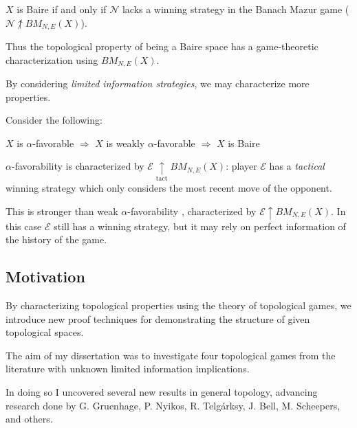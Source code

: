 \documentclass{beamer}
\theoremstyle{definition}
\newcommand{\win}{\uparrow}
\newcommand{\tactwin}{\underset{\text{tact}}{\uparrow}}
\newcommand{\<}{\langle}
\renewcommand{\>}{\rangle}
\newcommand{\pl}[1]{\mathscr{#1}}
\newcommand{\term}{\textit}
\newcommand{\bmGame}[1]{{BM}_{N,E}(#1)}
\begin{document}
\begin{frame}
  \begin{theorem}
    $X$ is Baire if and only if $\pl N$ lacks a winning strategy
    in the Banach Mazur game ($\pl N\not\win\bmGame{X}$).
  \end{theorem}

  \pause

  Thus the topological property of being a Baire space has a game-theoretic
  characterization using $\bmGame{X}$.

  \vpause

  By considering \term{limited information strategies}, we may characterize
  more properties.
\end{frame}

\begin{frame}
  Consider the following:

  \begin{theorem}
    $X$ is $\alpha$-favorable $\Rightarrow$
    $X$ is weakly $\alpha$-favorable $\Rightarrow$
    $X$ is Baire
  \end{theorem}

  \pause

  $\alpha$-favorability is characterized by $\pl E\tactwin\bmGame{X}$:
  player $\pl E$ has a \term{tactical} winning strategy which only considers
  the most recent move of the opponent.

  \vpause

  This is stronger than weak
  $\alpha$-favorability \cite{MR817083}, characterized by $\pl E\win\bmGame{X}$.
  In this case $\pl E$ still has a winning strategy, but it may
  rely on perfect information of the history of the game.
\end{frame}

\subsection{Motivation}

\begin{frame}
  By characterizing topological properties using the theory of
  topological games, we introduce new proof techniques for demonstrating
  the structure of given topological spaces.

  \vpause

  The aim of my dissertation was to investigate four topological games
  from the literature with unknown limited information implications.

  \vpause

  In doing so I uncovered several new results in general topology,
  advancing research done by
  G. Gruenhage, P. Nyikos, R. Telg{\' a}rksy, J. Bell,
  M. Scheepers, and others.
\end{frame}
\end{document}
